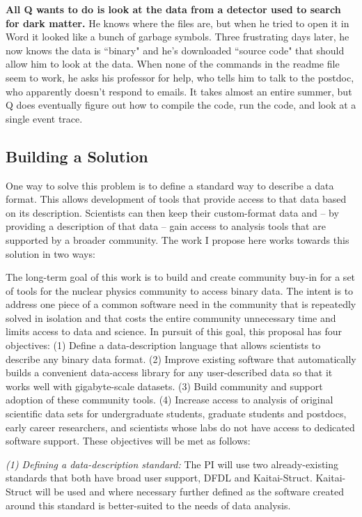 \textbf{All Q wants to do is look at the data from a detector used to search for dark matter.}  He knows where the files are, but when he tried to open it in Word it looked like a bunch of garbage symbols.  Three frustrating days later, he now knows the data is ``binary" and he's downloaded ``source code"  
that should allow him to look at the data.  When none of the commands in the readme file seem to work, he asks his professor for help, who tells him to talk to the postdoc, who apparently doesn't respond to emails.  It takes almost an entire summer, but Q does eventually figure out how to compile the code, run the code, and look at a single event trace.   

\subsection{Building a Solution}
One way to solve this problem is to define a standard way to describe a data format.  This allows development of tools that provide access to that data based on its description.  Scientists can then keep their custom-format data and – by providing a description of that data – gain access to analysis tools that are supported by a broader community.  The work I propose here works towards this solution in two ways:

The long-term goal of this work is to build and create community buy-in for a set of tools for the nuclear physics community to access binary data.  The intent is to address one piece of a common software need in the community that is repeatedly solved in isolation and that costs the entire community unnecessary time and limits access to data and science. In pursuit of this goal, this proposal has four objectives:  
(1) Define a data-description language that allows scientists to describe any binary data format.
(2) Improve existing software that automatically builds a convenient data-access library for any user-described data so that it works well with gigabyte-scale datasets.
(3) Build community and support adoption of these community tools.
(4) Increase access to analysis of original scientific data sets for undergraduate students, graduate students and postdocs, early career researchers, and scientists whose labs do not have access to dedicated software support. 
These objectives will be met as follows:

{\it (1) Defining a data-description standard:} The PI will use two already-existing standards that both have broad user support, DFDL and Kaitai-Struct.  Kaitai-Struct will be used and where necessary further defined as the software created around this standard is better-suited to the needs of data analysis.

